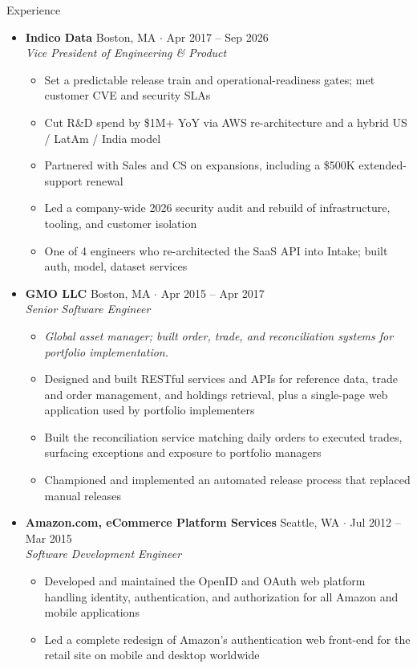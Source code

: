 \documentclass[10pt,oneside]{article}
\newenvironment{ressection}[1]{
  \vspace{4pt}
  {\fontfamily{phv}\selectfont\Large#1}
  \begin{itemize}
    \vspace{3pt}
}{
  \end{itemize}
}
\newcommand{\ressubitem}[1]{
  \vspace{-1pt}
\item \begin{flushleft} #1 \end{flushleft}
}
\newcommand{\rescontext}[1]{
  \vspace{-3pt}
\item[] \begin{flushleft} \textit{\small #1} \end{flushleft}
}
\newcommand{\resbigitem}[3]{
  \vspace{-5pt}
\item
  \textbf{#1} \hfill #2 \\
  \textit{#3}
}
\newenvironment{ressubsec}[3]{
  \resbigitem{#1}{#2}{#3}
  \vspace{-2pt}
  \begin{itemize}
}{
  \end{itemize}
}
\begin{document}
\begin{ressection}{Experience}
\begin{ressubsec}{Indico Data}{Boston, MA \; $\cdot$ \; Apr 2017 -- Sep 2026}{Vice President of Engineering \& Product}
    \ressubitem{Set a predictable release train and operational-readiness gates; met customer CVE and security SLAs}
    \ressubitem{Cut R\&D spend by \$1M+ YoY via AWS re-architecture and a hybrid US / LatAm / India model}
    \ressubitem{Partnered with Sales and CS on expansions, including a \$500K extended-support renewal}
    \ressubitem{Led a company-wide 2026 security audit and rebuild of infrastructure, tooling, and customer isolation}
    \ressubitem{One of 4 engineers who re-architected the SaaS API into Intake; built auth, model, dataset services}
  \end{ressubsec}

  \begin{ressubsec}{GMO LLC}{Boston, MA \; $\cdot$ \; Apr 2015 -- Apr 2017}{Senior Software Engineer}
    \rescontext{Global asset manager; built order, trade, and reconciliation systems for portfolio implementation.}
    \ressubitem{Designed and built RESTful services and APIs for reference data, trade and order management, and holdings retrieval, plus a single-page web application used by portfolio implementers}
    \ressubitem{Built the reconciliation service matching daily orders to executed trades, surfacing exceptions and exposure to portfolio managers}
    \ressubitem{Championed and implemented an automated release process that replaced manual releases}
  \end{ressubsec}

  \begin{ressubsec}{Amazon.com, eCommerce Platform Services}{Seattle, WA \; $\cdot$ \; Jul 2012 -- Mar 2015}{Software Development Engineer}
    \ressubitem{Developed and maintained the OpenID and OAuth web platform handling identity, authentication, and authorization for all Amazon and mobile applications}
    \ressubitem{Led a complete redesign of Amazon's authentication web front-end for the retail site on mobile and desktop worldwide}
  \end{ressubsec}

\end{ressection}
\end{document}
